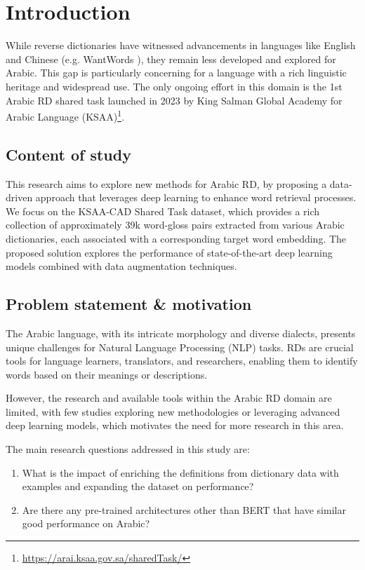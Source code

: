 \documentclass[12pt]{article}
\begin{document}
\newpage

\section{Introduction}

While reverse dictionaries have witnessed advancements in languages like English and Chinese (e.g. WantWords \cite{Qi2020}), they remain less developed and explored for Arabic. This gap is particularly concerning for a language with a rich linguistic heritage and widespread use. The only ongoing effort in this domain is the 1st Arabic RD shared task launched in 2023 by King Salman Global Academy for Arabic Language (KSAA)\footnote{\url{https://arai.ksaa.gov.sa/sharedTask/}}.


\subsection{Content of study}

This research aims to explore new methods for Arabic RD, by proposing a data-driven approach that leverages deep learning to enhance word retrieval processes. We focus on the KSAA-CAD Shared Task dataset, which provides a rich collection of approximately 39k word-gloss pairs extracted from various Arabic dictionaries, each associated with a corresponding target word embedding. The proposed solution explores the performance of state-of-the-art deep learning models combined with data augmentation techniques.

\subsection{Problem statement \& motivation}

The Arabic language, with its intricate morphology and diverse dialects, presents unique challenges for Natural Language Processing (NLP) tasks. RDs are crucial tools for language learners, translators, and researchers, enabling them to identify words based on their meanings or descriptions.

However, the research and available tools within the Arabic RD domain are limited, with few studies exploring new methodologies or leveraging advanced deep learning models, which motivates the need for more research in this area.

The main research questions addressed in this study are:
\begin{enumerate}
    \item What is the impact of enriching the definitions from dictionary data with examples and expanding the dataset on performance?
    \item Are there any pre-trained architectures other than BERT that have similar good performance on Arabic?
\end{enumerate}
\end{document}
